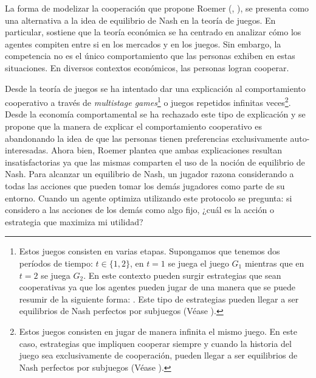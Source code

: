 La forma de modelizar la cooperación que propone Roemer (\citeyear{Roemer_2019}, \citeyear{Roemer_2021a}), se presenta como una alternativa a la idea de equilibrio de Nash en la teoría de juegos. En particular, \citet{Roemer_2019} sostiene que la teoría económica se ha centrado en analizar cómo los agentes compiten entre si en los mercados y en los juegos. Sin embargo, la competencia no es el único comportamiento que las personas exhiben en estas situaciones. En diversos contextos económicos, las personas logran cooperar. 

Desde la teoría de juegos se ha intentado dar una explicación al comportamiento cooperativo a través de \textit{multistage games}\footnote{Estos juegos consisten en varias etapas. Supongamos que tenemos dos períodos de tiempo: $t \in \{1,2\}$, en $t=1$ se juega el juego $G_1$ mientras que en $t=2$ se juega $G_2$. En este contexto pueden surgir estrategias que sean cooperativas ya que los agentes pueden jugar de una manera que se puede resumir de la siguiente forma: . Este tipo de estrategias pueden llegar a ser equilibrios de Nash perfectos por subjuegos (Véase \citet[cap. 9]{Tadelis_2013}).} o juegos repetidos infinitas veces\footnote{Estos juegos consisten en jugar de manera infinita el mismo juego. En este caso, estrategias que impliquen cooperar siempre y cuando la historia del juego sea exclusivamente de cooperación, pueden llegar a ser equilibrios de Nash perfectos por subjuegos (Véase \citet[cap. 10]{Tadelis_2013}).}. Desde la economía comportamental se ha rechazado este tipo de explicación y se propone que la manera de explicar el comportamiento cooperativo es abandonando la idea de que las personas tienen preferencias exclusivamente auto-interesadas. Ahora bien, Roemer plantea que ambas explicaciones resultan insatisfactorias ya que las mismas comparten el uso de la noción de equilibrio de Nash. Para alcanzar un equilibrio de Nash, un jugador razona considerando a todas las acciones que pueden tomar los demás jugadores como parte de su entorno. Cuando un agente optimiza utilizando este protocolo se pregunta: si considero a las acciones de los demás como algo fijo, ¿cuál es la acción o estrategia que maximiza mi utilidad? 

